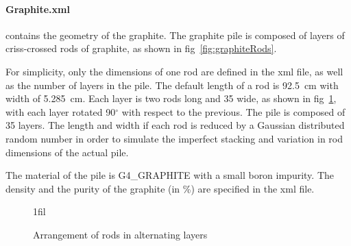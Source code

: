 \documentclass{article}
\makeatletter
\newcommand*{\centerfloat}{%
  \parindent \z@
  \leftskip \z@ \@plus 1fil \@minus \textwidth
  \rightskip\leftskip
  \parfillskip \z@skip}
\makeatother
\begin{document}
	\paragraph{Graphite.xml} contains the geometry of the graphite. The graphite pile is composed of layers of criss-crossed rods of graphite, as shown in fig~\ref{fig:graphiteRods}. 

	For simplicity, only the dimensions of one rod are defined in the xml file, as well as the number of layers in the pile. The default length of a rod is 92.5~cm with width of 5.285~cm. Each layer is two rods long and 35 wide, as shown in fig~\ref{fig:layers}, with each layer rotated 90$^{\circ}$ with respect to the previous. The pile is composed of 35 layers. The length and width if each rod is reduced by a Gaussian distributed random number in order to simulate the imperfect stacking and variation in rod dimensions of the actual pile. 

	The material of the pile is G4\_GRAPHITE with a small boron impurity. The density and the purity of the graphite (in \%) are specified in the xml file.


\begin{figure}
	\centerfloat
	\caption{Arrangement of rods in alternating layers}	
	\label{fig:layers}
\end{figure}
\end{document}
